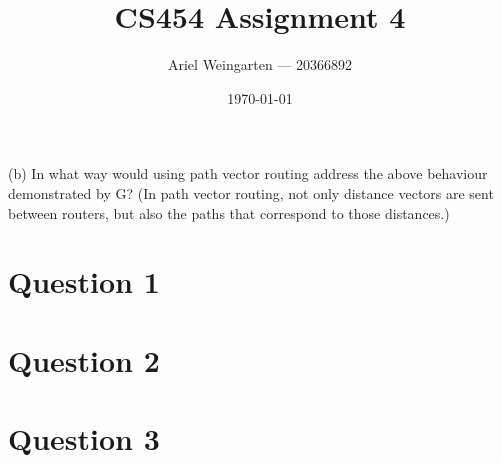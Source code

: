 \documentclass[a4paper]{article}
\title{CS454 Assignment 4}
\author{Ariel Weingarten --- 20366892}
\date{\today}
\begin{document}
\maketitle

(b) In what way would using path vector routing address the above behaviour demonstrated by G? (In path vector routing, not only distance vectors are sent between routers, but also the paths that correspond to those distances.)
\section{Question 1}

\section{Question 2}

\section{Question 3}
\end{document}
